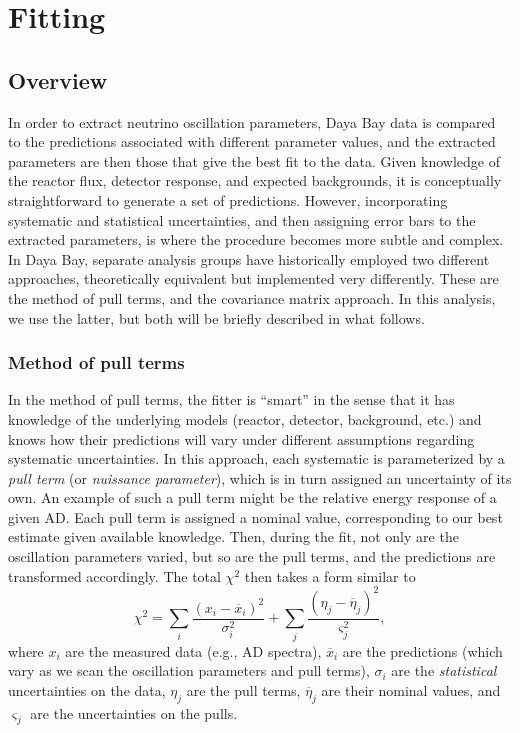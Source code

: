 \documentclass[../thesis.tex]{subfiles}
\begin{document}
\chapter{Fitting}
\label{chap:fitting}

\section{Overview}
\label{sec:fitoverview}

In order to extract neutrino oscillation parameters, Daya Bay data is compared to the predictions associated with different parameter values, and the extracted parameters are then those that give the best fit to the data. Given knowledge of the reactor flux, detector response, and expected backgrounds, it is conceptually straightforward to generate a set of predictions. However, incorporating systematic and statistical uncertainties, and then assigning error bars to the extracted parameters, is where the procedure becomes more subtle and complex. In Daya Bay, separate analysis groups have historically employed two different approaches, theoretically equivalent but implemented very differently. These are the method of pull terms, and the covariance matrix approach. In this analysis, we use the latter, but both will be briefly described in what follows.

\subsection{Method of pull terms}
\label{sec:pullterms}

In the method of pull terms, the fitter is ``smart'' in the sense that it has knowledge of the underlying models (reactor, detector, background, etc.) and knows how their predictions will vary under different assumptions regarding systematic uncertainties. In this approach, each systematic is parameterized by a \emph{pull term} (or \emph{nuissance parameter}), which is in turn assigned an uncertainty of its own. An example of such a pull term might be the relative energy response of a given AD. Each pull term is assigned a nominal value, corresponding to our best estimate given available knowledge. Then, during the fit, not only are the oscillation parameters varied, but so are the pull terms, and the predictions are transformed accordingly. The total $\chi^2$ then takes a form similar to
\[ \chi^2 = \sum_i \frac{(x_i - \overline x_i)^2}{\sigma_i^2}
  + \sum_j \frac{(\eta_j - \overline \eta_j)^2}{\varsigma_j^2}, \]
where $x_i$ are the measured data (e.g., AD spectra), $\overline x_i$ are the predictions (which vary as we scan the oscillation parameters and pull terms), $\sigma_i$ are the \emph{statistical} uncertainties on the data, $\eta_j$ are the pull terms, $\overline \eta_j$ are their nominal values, and $\varsigma_j$ are the uncertainties on the pulls.
\end{document}
